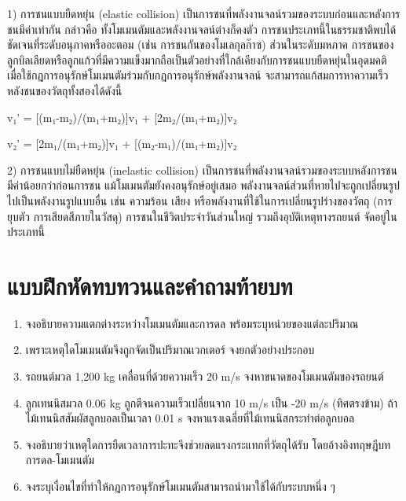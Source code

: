 \begin{examplebox}
1) การชนแบบยืดหยุ่น (elastic collision) เป็นการชนที่พลังงานจลน์รวมของระบบก่อนและหลังการชนมีค่าเท่ากัน กล่าวคือ ทั้งโมเมนตัมและพลังงานจลน์ต่างก็คงตัว การชนประเภทนี้ในธรรมชาติพบได้ชัดเจนที่ระดับอนุภาคหรืออะตอม (เช่น การชนกันของโมเลกุลก๊าซ) ส่วนในระดับมหภาค การชนของลูกบิลเลียดหรือลูกแก้วที่มีความแข็งมากถือเป็นตัวอย่างที่ใกล้เคียงกับการชนแบบยืดหยุ่นในอุดมคติ เมื่อใช้กฎการอนุรักษ์โมเมนตัมร่วมกับกฎการอนุรักษ์พลังงานจลน์ จะสามารถแก้สมการหาความเร็วหลังชนของวัตถุทั้งสองได้ดังนี้

v₁' = [(m₁-m₂)/(m₁+m₂)]v₁ + [2m₂/(m₁+m₂)]v₂

v₂' = [2m₁/(m₁+m₂)]v₁ + [(m₂-m₁)/(m₁+m₂)]v₂

2) การชนแบบไม่ยืดหยุ่น (inelastic collision) เป็นการชนที่พลังงานจลน์รวมของระบบหลังการชนมีค่าน้อยกว่าก่อนการชน แม้โมเมนตัมยังคงอนุรักษ์อยู่เสมอ พลังงานจลน์ส่วนที่หายไปจะถูกเปลี่ยนรูปไปเป็นพลังงานรูปแบบอื่น เช่น ความร้อน เสียง หรือพลังงานที่ใช้ในการเปลี่ยนรูปร่างของวัตถุ (การยุบตัว การเสียดสีภายในวัสดุ) การชนในชีวิตประจำวันส่วนใหญ่ รวมถึงอุบัติเหตุทางรถยนต์ จัดอยู่ในประเภทนี้
\end{examplebox}

\section{แบบฝึกหัดทบทวนและคำถามท้ายบท}

\begin{enumerate}
    \item จงอธิบายความแตกต่างระหว่างโมเมนตัมและการดล พร้อมระบุหน่วยของแต่ละปริมาณ
    \item เพราะเหตุใดโมเมนตัมจึงถูกจัดเป็นปริมาณเวกเตอร์ จงยกตัวอย่างประกอบ
    \item รถยนต์มวล 1,200 kg เคลื่อนที่ด้วยความเร็ว 20 m/s จงหาขนาดของโมเมนตัมของรถยนต์
    \item ลูกเทนนิสมวล 0.06 kg ถูกตีจนความเร็วเปลี่ยนจาก 10 m/s เป็น -20 m/s (ทิศตรงข้าม) ถ้าไม้เทนนิสสัมผัสลูกบอลเป็นเวลา 0.01 s จงหาแรงเฉลี่ยที่ไม้เทนนิสกระทำต่อลูกบอล
    \item จงอธิบายว่าเหตุใดการยืดเวลาการปะทะจึงช่วยลดแรงกระแทกที่วัตถุได้รับ โดยอ้างอิงทฤษฎีบทการดล-โมเมนตัม
    \item จงระบุเงื่อนไขที่ทำให้กฎการอนุรักษ์โมเมนตัมสามารถนำมาใช้ได้กับระบบหนึ่ง ๆ
\end{enumerate}

